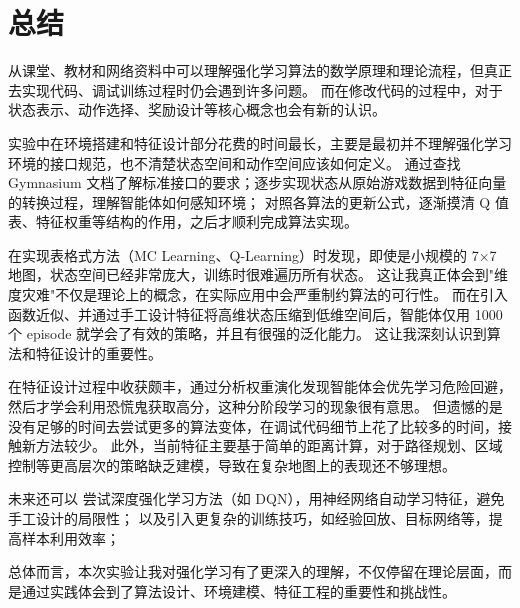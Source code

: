 \section{总结}

从课堂、教材和网络资料中可以理解强化学习算法的数学原理和理论流程，但真正去实现代码、调试训练过程时仍会遇到许多问题。
而在修改代码的过程中，对于状态表示、动作选择、奖励设计等核心概念也会有新的认识。

实验中在环境搭建和特征设计部分花费的时间最长，主要是最初并不理解强化学习环境的接口规范，也不清楚状态空间和动作空间应该如何定义。
通过查找 Gymnasium 文档了解标准接口的要求；逐步实现状态从原始游戏数据到特征向量的转换过程，理解智能体如何感知环境；
对照各算法的更新公式，逐渐摸清 Q 值表、特征权重等结构的作用，之后才顺利完成算法实现。

在实现表格式方法（MC Learning、Q-Learning）时发现，即使是小规模的 7×7 地图，状态空间已经非常庞大，训练时很难遍历所有状态。
这让我真正体会到"维度灾难"不仅是理论上的概念，在实际应用中会严重制约算法的可行性。
而在引入函数近似、并通过手工设计特征将高维状态压缩到低维空间后，智能体仅用 1000 个 episode 就学会了有效的策略，并且有很强的泛化能力。
这让我深刻认识到算法和特征设计的重要性。

在特征设计过程中收获颇丰，通过分析权重演化发现智能体会优先学习危险回避，然后才学会利用恐慌鬼获取高分，这种分阶段学习的现象很有意思。
但遗憾的是没有足够的时间去尝试更多的算法变体，在调试代码细节上花了比较多的时间，接触新方法较少。
此外，当前特征主要基于简单的距离计算，对于路径规划、区域控制等更高层次的策略缺乏建模，导致在复杂地图上的表现还不够理想。

未来还可以
尝试深度强化学习方法（如 DQN），用神经网络自动学习特征，避免手工设计的局限性；
以及引入更复杂的训练技巧，如经验回放、目标网络等，提高样本利用效率；

总体而言，本次实验让我对强化学习有了更深入的理解，不仅停留在理论层面，而是通过实践体会到了算法设计、环境建模、特征工程的重要性和挑战性。